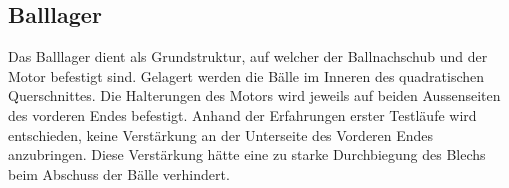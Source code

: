 \subsection{Balllager}
Das Balllager dient als Grundstruktur, auf welcher der Ballnachschub und der 
Motor befestigt sind. Gelagert werden die Bälle im Inneren des quadratischen 
Querschnittes. Die Halterungen des Motors wird jeweils auf 
beiden Aussenseiten des vorderen Endes befestigt. Anhand der Erfahrungen erster Testläufe wird entschieden, keine Verstärkung an der Unterseite des Vorderen Endes anzubringen. Diese Verstärkung hätte eine zu starke Durchbiegung des Blechs beim Abschuss der Bälle verhindert.
